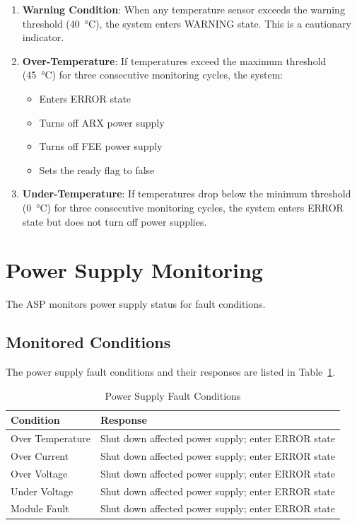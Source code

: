 \begin{enumerate}
    \item \textbf{Warning Condition}: When any temperature sensor exceeds the warning threshold (\SI{40}{\degreeCelsius}), the system enters WARNING state. This is a cautionary indicator.

    \item \textbf{Over-Temperature}: If temperatures exceed the maximum threshold (\SI{45}{\degreeCelsius}) for three consecutive monitoring cycles, the system:
    \begin{itemize}
        \item Enters ERROR state
        \item Turns off ARX power supply
        \item Turns off FEE power supply
        \item Sets the ready flag to false
    \end{itemize}

    \item \textbf{Under-Temperature}: If temperatures drop below the minimum threshold (\SI{0}{\degreeCelsius}) for three consecutive monitoring cycles, the system enters ERROR state but does not turn off power supplies.
\end{enumerate}

\section{Power Supply Monitoring}

The ASP monitors power supply status for fault conditions.

\subsection{Monitored Conditions}

The power supply fault conditions and their responses are listed in Table~\ref{tab:psu-faults}.

\begin{table}[htbp]
    \centering
    \caption{Power Supply Fault Conditions}
    \label{tab:psu-faults}
    \begin{tabular}{lp{8cm}}
        \toprule
        \textbf{Condition} & \textbf{Response} \\
        \midrule
        Over Temperature & Shut down affected power supply; enter ERROR state \\
        Over Current & Shut down affected power supply; enter ERROR state \\
        Over Voltage & Shut down affected power supply; enter ERROR state \\
        Under Voltage & Shut down affected power supply; enter ERROR state \\
        Module Fault & Shut down affected power supply; enter ERROR state \\
        \bottomrule
    \end{tabular}
\end{table}

